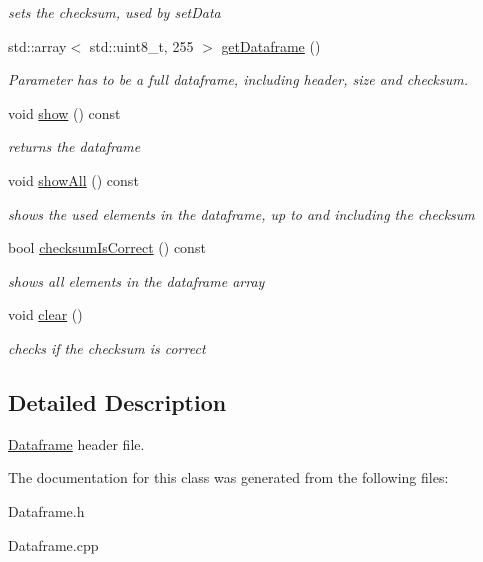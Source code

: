 \begin{DoxyCompactItemize}
\begin{DoxyCompactList}\small\item\em sets the checksum, used by set\+Data \end{DoxyCompactList}\item 
std\+::array$<$ std\+::uint8\+\_\+t, 255 $>$ \hyperlink{classDataframe_af10dc242c0f25b30a31d2ce091230729}{get\+Dataframe} ()\hypertarget{classDataframe_af10dc242c0f25b30a31d2ce091230729}{}\label{classDataframe_af10dc242c0f25b30a31d2ce091230729}

\begin{DoxyCompactList}\small\item\em Parameter has to be a full dataframe, including header, size and checksum. \end{DoxyCompactList}\item 
void \hyperlink{classDataframe_a5facab5165e8924c4094a520e2955c75}{show} () const \hypertarget{classDataframe_a5facab5165e8924c4094a520e2955c75}{}\label{classDataframe_a5facab5165e8924c4094a520e2955c75}

\begin{DoxyCompactList}\small\item\em returns the dataframe \end{DoxyCompactList}\item 
void \hyperlink{classDataframe_ae0debedd55c0f908313f57bfb458dee9}{show\+All} () const \hypertarget{classDataframe_ae0debedd55c0f908313f57bfb458dee9}{}\label{classDataframe_ae0debedd55c0f908313f57bfb458dee9}

\begin{DoxyCompactList}\small\item\em shows the used elements in the dataframe, up to and including the checksum \end{DoxyCompactList}\item 
bool \hyperlink{classDataframe_a7e1c56a10758775470f9550aaf0c1730}{checksum\+Is\+Correct} () const \hypertarget{classDataframe_a7e1c56a10758775470f9550aaf0c1730}{}\label{classDataframe_a7e1c56a10758775470f9550aaf0c1730}

\begin{DoxyCompactList}\small\item\em shows all elements in the dataframe array \end{DoxyCompactList}\item 
void \hyperlink{classDataframe_abb1672538595a1189ab19583504b9803}{clear} ()\hypertarget{classDataframe_abb1672538595a1189ab19583504b9803}{}\label{classDataframe_abb1672538595a1189ab19583504b9803}

\begin{DoxyCompactList}\small\item\em checks if the checksum is correct \end{DoxyCompactList}\end{DoxyCompactItemize}


\subsection{Detailed Description}
\hyperlink{classDataframe}{Dataframe} header file. 

The documentation for this class was generated from the following files\+:\begin{DoxyCompactItemize}
\item 
Dataframe.\+h\item 
Dataframe.\+cpp\end{DoxyCompactItemize}

